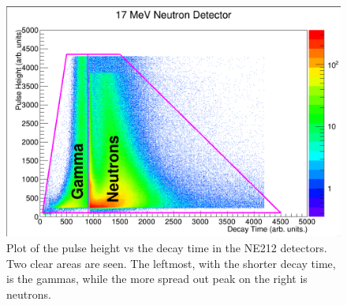 \begin{figure}[t]
    \centering
    \includegraphics[scale=0.3]{Setup_Figs/17MeVNeutron.png}
    \caption{Plot of the pulse height vs the decay time in the NE212 detectors. Two clear areas are seen. The leftmost, with the shorter decay time, is the gammas, while the more spread out peak on the right is neutrons.}
    \label{fig:neutron}
\end{figure}